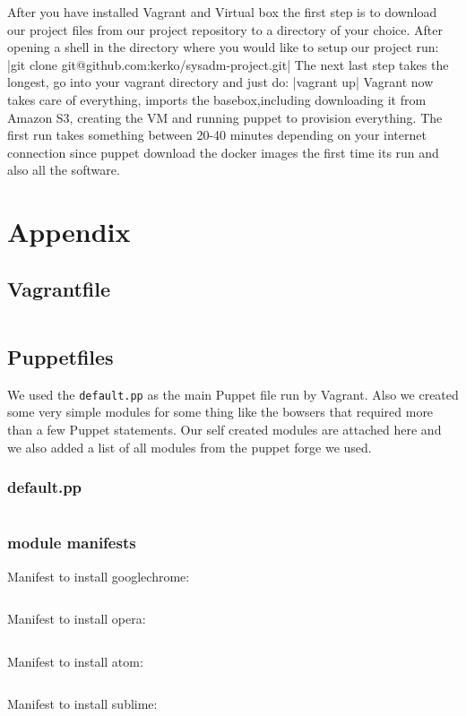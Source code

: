 After you have installed Vagrant and Virtual box the first step is to download our project files from our project repository to a directory of your choice. After opening a shell in the directory where you would like to setup our project run: |git clone git@github.com:kerko/sysadm-project.git|
The next last step takes the longest, go into your vagrant directory and just do: |vagrant up| Vagrant now takes care of everything, imports the basebox,including downloading it from Amazon S3, creating the \gls{VM} and running puppet to provision everything. The first run takes something between 20-40 minutes depending on your internet connection since puppet download the docker images the first time its run and also all the software.



\cleardoublepage{}
\section{Appendix}
\subsection{Vagrantfile}
\inputminted[linenos=true]{ruby}{../../vagrant/Vagrantfile}
\subsection{Puppetfiles}
We used the  \verb|default.pp| as the main Puppet file run by Vagrant. Also we created some very simple modules for some thing like the bowsers that required more than a few Puppet statements. Our self created modules are attached here and we also added a list of all modules from the puppet forge we used.
\subsubsection{default.pp}
\inputminted[linenos=true]{puppet}{../../puppet/manifests/default.pp}
\subsubsection{module manifests}
Manifest to install googlechrome:
\inputminted[linenos=true]{puppet}{../../puppet/modules/googlechrome/manifests/init.pp}
Manifest to install opera:
\inputminted[linenos=true]{puppet}{../../puppet/modules/opera/manifests/init.pp}
Manifest to install atom:
\inputminted[linenos=true]{puppet}{../../puppet/modules/atom/manifests/init.pp}
Manifest to install sublime:
\inputminted[linenos=true]{puppet}{../../puppet/modules/sublime/manifests/init.pp}


